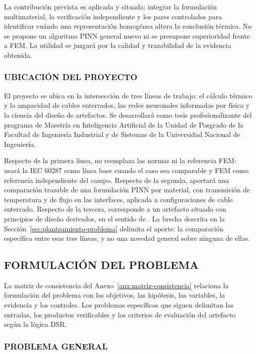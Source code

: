La contribución prevista es aplicada y situada: integrar la formulación multimaterial, la verificación independiente y los pares controlados para identificar cuándo una representación homogénea altera la conclusión térmica. No se propone un algoritmo PINN general nuevo ni se presupone superioridad frente a FEM. La utilidad se juzgará por la calidad y trazabilidad de la evidencia obtenida.

\subsubsection{UBICACIÓN DEL PROYECTO}

El proyecto se ubica en la intersección de tres líneas de trabajo: el cálculo térmico y la ampacidad de cables enterrados, las redes neuronales informadas por física y la ciencia del diseño de artefactos. Se desarrollará como tesis profesionalizante del programa de Maestría en Inteligencia Artificial de la Unidad de Posgrado de la Facultad de Ingeniería Industrial y de Sistemas de la Universidad Nacional de Ingeniería.

Respecto de la primera línea, no reemplaza las normas ni la referencia FEM: usará la IEC 60287 como línea base cuando el caso sea comparable y FEM como referencia independiente del campo. Respecto de la segunda, aportará una comparación trazable de una formulación PINN por material, con transmisión de temperatura y de flujo en las interfaces, aplicada a configuraciones de cable enterrado. Respecto de la tercera, corresponde a un artefacto situado con principios de diseño derivados, en el sentido de \textcite[342--350]{gregor2013}. La brecha descrita en la Sección~\ref{sec:planteamiento-problema} delimita el aporte: la comparación específica entre esas tres líneas, y no una novedad general sobre ninguna de ellas.

\subsection{FORMULACIÓN DEL PROBLEMA}

La matriz de consistencia del Anexo~\ref{anx:matriz-consistencia} relaciona la formulación del problema con los objetivos, las hipótesis, las variables, la evidencia y los controles. Los problemas específicos que siguen delimitan las entradas, los productos verificables y los criterios de evaluación del artefacto según la lógica DSR.

\subsubsection{PROBLEMA GENERAL}

